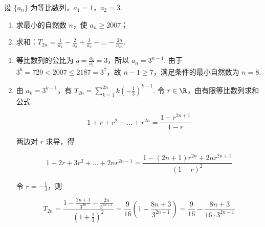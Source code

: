\begin{problem}
设 \(\{a_{n}\}\) 为等比数列，\(a_1 = 1\)，\(a_2 = 3\).

\begin{enumerate}
\item 求最小的自然数 \(n\)，使 \(a_n \geqslant 2007\)；
\item 求和：\(T_{2n} = \frac{1}{a_1} - \frac{2}{a_2} + \frac{3}{a_3} - \dots - \frac{2n}{a_{2n}}\).
\end{enumerate}

\begin{solution}
\begin{enumerate}
\item 等比数列的公比为 \(q=\frac{a_2}{a_1}=3\)，所以 \(a_n=3^{n-1}\). 由于 \(3^6=729<2007\leqslant2187=3^7\)，故 \(n-1\geqslant7\)，满足条件的最小自然数为 \(n=8\).

\item 由 \(a_k=3^{k-1}\)，有 \(T_{2n}=\sum_{k=1}^{2n}k\left(-\frac{1}{3}\right)^{k-1}\). 令 \(r\in\R\)，由有限等比数列求和公式

\[
1+r+r^2+\dots+r^{2n}=\frac{1-r^{2n+1}}{1-r}
\]

两边对 \(r\) 求导，得

\[
1+2r+3r^2+\dots+2nr^{2n-1}=\frac{1-(2n+1)r^{2n}+2nr^{2n+1}}{(1-r)^2}
\]

令 \(r=-\frac{1}{3}\)，则

\[
T_{2n}=\frac{1-\frac{2n+1}{3^{2n}}-\frac{2n}{3^{2n+1}}}{\left(1+\frac{1}{3}\right)^2}=\frac{9}{16}\left(1-\frac{8n+3}{3^{2n+1}}\right)=\frac{9}{16}-\frac{8n+3}{16\cdot3^{2n-1}}
\]
\end{enumerate}
\end{solution}
\end{problem}

